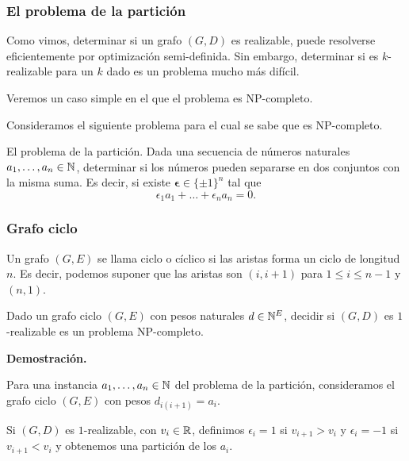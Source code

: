 \documentclass[aspectratio=169,12pt,spanish]{beamer}
\begin{document}

\begin{frame}
\frametitle{El problema de la partición}

Como vimos, determinar si un grafo $(G, D)$ es realizable, puede resolverse eficientemente por optimización semi-definida.
Sin embargo, determinar si es $k$-realizable para un $k$ dado es un problema mucho más difícil.

Veremos un caso simple en el que el problema es NP-completo.

Consideramos el siguiente problema para el cual se sabe que es NP-completo.

\begin{block}{El problema de la partición.}
Dada una secuencia de números naturales $a_1, \dots, a_n \in \mathbb{N}$, determinar si los números pueden separarse en dos conjuntos con la misma suma. Es decir, si existe $\bm{\epsilon} \in \{\pm 1\}^n$ tal que
$$
\epsilon_1 a_1 + \dots + \epsilon_n a_n = 0.
$$
\end{block}

\end{frame}


\begin{frame}
\frametitle{Grafo ciclo}

Un grafo $(G, E)$ se llama ciclo o cíclico si las aristas forma un ciclo de longitud $n$. Es decir, podemos suponer que las aristas son $(i, i+1)$ para $1 \le i \le n-1$ y $(n, 1)$.

\begin{theorem}
Dado un grafo ciclo $(G, E)$ con pesos naturales $d \in \mathbb{N}^E$, decidir si $(G,D)$ es $1$-realizable es un problema NP-completo.
\end{theorem}

\textbf{Demostración.}

Para una instancia $a_1, \dots, a_n \in \mathbb{N}$ del problema de la partición, consideramos el grafo ciclo $(G,E)$ con pesos $d_{i(i+1)} = a_i$.

Si $(G,D)$ es $1$-realizable, con $v_i \in \mathbb{R}$, definimos $\epsilon_i = 1$ si $v_{i+1} > v_i$ y $\epsilon_i = -1$ si $v_{i+1} < v_i$ y obtenemos una partición de los $a_i$.




\end{frame}

\end{document}

